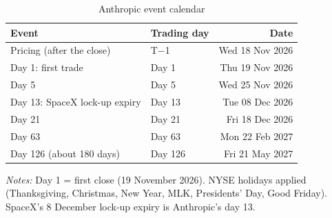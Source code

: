 \begin{table}[!htbp]\centering\small
\caption{Anthropic event calendar}\label{tab:cal}

\begin{threeparttable}
\begin{tabular}{llr}
\toprule
Event & Trading day & Date \\
\midrule
Pricing (after the close) & T$-$1 & Wed 18 Nov 2026 \\
Day 1: first trade & Day 1 & Thu 19 Nov 2026 \\
Day 5 & Day 5 & Wed 25 Nov 2026 \\
Day 13: SpaceX lock-up expiry & Day 13 & Tue 08 Dec 2026 \\
Day 21 & Day 21 & Fri 18 Dec 2026 \\
Day 63 & Day 63 & Mon 22 Feb 2027 \\
Day 126 (about 180 days) & Day 126 & Fri 21 May 2027 \\
\bottomrule
\end{tabular}
\begin{tablenotes}[flushleft]\footnotesize
\item \textit{Notes:} Day 1 = first close (19 November 2026). NYSE holidays applied (Thanksgiving, Christmas, New Year, MLK, Presidents' Day, Good Friday). SpaceX's 8 December lock-up expiry is Anthropic's day 13.
\end{tablenotes}
\end{threeparttable}

\end{table}
